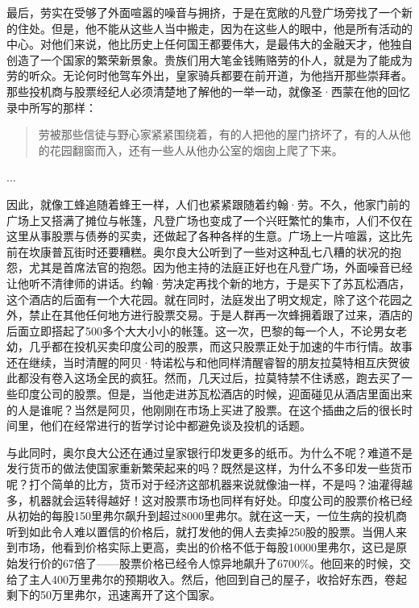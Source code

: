 \documentclass[12pt,oneside]{book}
\begin{document}
最后，劳实在受够了外面喧嚣的噪音与拥挤，于是在宽敞的凡登广场旁找了一个新的住处。但是，他不能从这些人当中搬走，因为在这些人的眼中，他是所有活动的中心。对他们来说，他比历史上任何国王都要伟大，是最伟大的金融天才，他独自创造了一个国家的繁荣新景象。贵族们用大笔金钱贿赂劳的仆人，就是为了能成为劳的听众。无论何时他驾车外出，皇家骑兵都要在前开道，为他挡开那些崇拜者。那些投机商与股票经纪人必须清楚地了解他的一举一动，就像圣·西蒙在他的回忆录中所写的那样：

\begin{quote}
劳被那些信徒与野心家紧紧围绕着，有的人把他的屋门挤坏了，有的人从他的花园翻窗而入，还有一些人从他办公室的烟囱上爬了下来。
\end{quote}

...

因此，就像工蜂追随着蜂王一样，人们也紧紧跟随着约翰·劳。不久，他家门前的广场上又搭满了摊位与帐篷，凡登广场也变成了一个兴旺繁忙的集市，人们不仅在这里从事股票与债券的买卖，还做起了各种各样的生意。广场上一片喧嚣，这比先前在坎康普瓦街时还要糟糕。奥尔良大公听到了一些对这种乱七八糟的状况的抱怨，尤其是首席法官的抱怨。因为他主持的法庭正好也在凡登广场，外面噪音已经让他听不清律师的讲话。约翰·劳决定再找个新的地方，于是买下了苏瓦松酒店，这个酒店的后面有一个大花园。就在同时，法庭发出了明文规定，除了这个花园之外，禁止在其他任何地方进行股票交易。于是人群再一次蜂拥着跟了过来，酒店的后面立即搭起了500多个大大小小的帐篷。这一次，巴黎的每一个人，不论男女老幼，几乎都在投机买卖印度公司的股票，而这只股票正处于加速的牛市行情。故事还在继续，当时清醒的阿贝·特诺松与和他同样清醒睿智的朋友拉莫特相互庆贺彼此都没有卷入这场全民的疯狂。然而，几天过后，拉莫特禁不住诱惑，跑去买了一些印度公司的股票。但是，当他走进苏瓦松酒店的时候，迎面碰见从酒店里面出来的人是谁呢？当然是阿贝，他刚刚在市场上买进了股票。在这个插曲之后的很长时间里，他们在经常进行的哲学讨论中都避免谈及投机的话题。

与此同时，奥尔良大公还在通过皇家银行印发更多的纸币。为什么不呢？难道不是发行货币的做法使国家重新繁荣起来的吗？既然是这样，为什么不多印发一些货币呢？打个简单的比方，货币对于经济这部机器来说就像油一样，不是吗？油灌得越多，机器就会运转得越好！这对股票市场也同样有好处。印度公司的股票价格已经从初始的每股150里弗尔飙升到超过8000里弗尔。就在这一天，一位生病的投机商听到如此令人难以置信的价格后，就打发他的佣人去卖掉250股的股票。当佣人来到市场，他看到价格实际上更高，卖出的价格不低于每股10000里弗尔，这已是原始发行价的67倍了——股票价格已经令人惊异地飙升了6700\%。他回来的时候，交给了主人400万里弗尔的预期收入。然后，他回到自己的屋子，收拾好东西，卷起剩下的50万里弗尔，迅速离开了这个国家。
\end{document}
